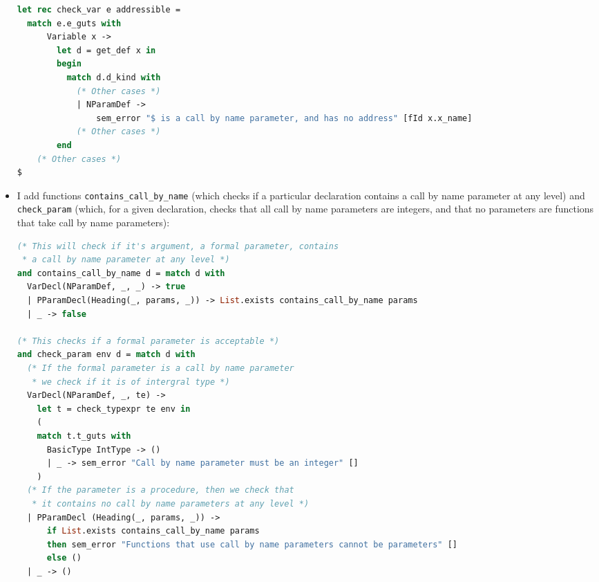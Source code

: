 \documentclass[a4paper,10pt]{article}
\begin{document}
\begin{itemize}
        \begin{lstlisting}[language=ml]
let rec check_var e addressible =
  match e.e_guts with
      Variable x ->
        let d = get_def x in
        begin
          match d.d_kind with 
            (* Other cases *)
            | NParamDef ->
                sem_error "$ is a call by name parameter, and has no address" [fId x.x_name]
            (* Other cases *)
        end
    (* Other cases *)
$
        \end{lstlisting}
    \item I add functions \texttt{contains\_call\_by\_name} (which checks if a particular declaration contains a call by name parameter at any level) and \texttt{check\_param} (which, for a given declaration, checks that all call by name parameters are integers, and that no parameters are functions that take call by name parameters):
\begin{lstlisting}[language=ml]
(* This will check if it's argument, a formal parameter, contains 
 * a call by name parameter at any level *)
and contains_call_by_name d = match d with
  VarDecl(NParamDef, _, _) -> true
  | PParamDecl(Heading(_, params, _)) -> List.exists contains_call_by_name params
  | _ -> false

(* This checks if a formal parameter is acceptable *)
and check_param env d = match d with
  (* If the formal parameter is a call by name parameter
   * we check if it is of intergral type *)
  VarDecl(NParamDef, _, te) ->
    let t = check_typexpr te env in
    (
    match t.t_guts with
      BasicType IntType -> ()
      | _ -> sem_error "Call by name parameter must be an integer" []
    )
  (* If the parameter is a procedure, then we check that
   * it contains no call by name parameters at any level *)
  | PParamDecl (Heading(_, params, _)) ->
      if List.exists contains_call_by_name params
      then sem_error "Functions that use call by name parameters cannot be parameters" []
      else ()
  | _ -> ()
\end{lstlisting}
\end{itemize}
\end{document}
